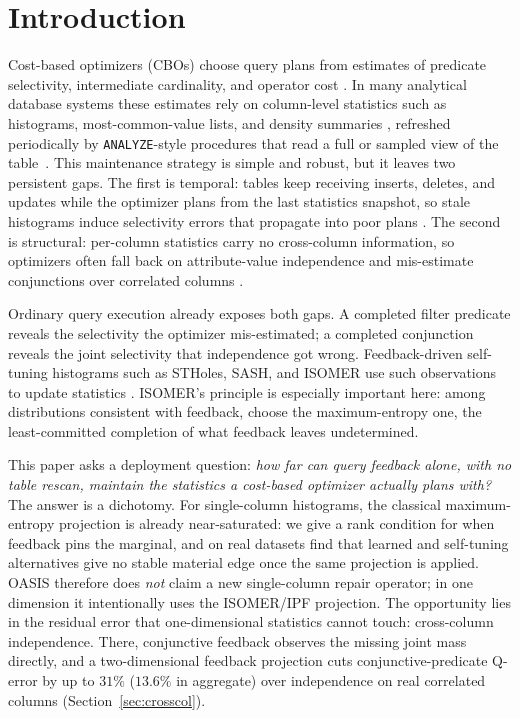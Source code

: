 \documentclass[preprint,12pt]{elsarticle}
\begin{document}
\section{Introduction}
\label{sec:intro}

Cost-based optimizers (CBOs) choose query plans from estimates of predicate
selectivity, intermediate cardinality, and operator cost
\cite{selinger1979access,chaudhuri1998overview}. In many analytical database
systems these estimates rely on column-level statistics such as histograms,
most-common-value lists, and density summaries
\cite{ioannidis1993histogram,poosala1997selectivity,postgresqlPlannerStats,postgresqlRowEstimation},
refreshed periodically by \texttt{ANALYZE}-style procedures that read a full or
sampled view of the table~\cite{postgresqlAnalyze}. This maintenance strategy is
simple and robust, but it leaves two persistent gaps. The first is temporal: tables keep
receiving inserts, deletes, and updates while the optimizer plans from the last statistics
snapshot, so stale histograms induce selectivity errors that propagate into poor plans
\cite{leis2015good,moerkotte2009preventing,han2021cardinality,lee2023impact}. The second is
structural: per-column statistics carry no cross-column information, so optimizers often fall
back on attribute-value independence and mis-estimate conjunctions over correlated columns
\cite{poosala1997selectivity,leis2015good}.

Ordinary query execution already exposes both gaps. A completed filter predicate reveals the
selectivity the optimizer mis-estimated; a completed conjunction reveals the joint selectivity
that independence got wrong. Feedback-driven self-tuning histograms such as STHoles, SASH,
and ISOMER use such observations to update statistics
\cite{aboulnaga1999self,bruno2001stholes,lim2003sash,markl2007consistent}. ISOMER's principle
is especially important here: among distributions consistent with feedback, choose the
maximum-entropy one, the least-committed completion of what feedback leaves undetermined.

This paper asks a deployment question: \emph{how far can query feedback alone, with no table
rescan, maintain the statistics a cost-based optimizer actually plans with?} The answer is a
dichotomy. For single-column histograms, the classical maximum-entropy projection is already
near-saturated: we give a rank condition for when feedback pins the marginal, and on real
datasets find that learned and self-tuning alternatives give no stable material edge once the
same projection is applied. OASIS therefore does \emph{not} claim a new single-column repair
operator; in one dimension it intentionally uses the ISOMER/IPF projection. The opportunity
lies in the residual error that one-dimensional statistics cannot touch: cross-column
independence. There, conjunctive feedback observes the missing joint mass directly, and a
two-dimensional feedback projection cuts conjunctive-predicate Q-error by up to $31\%$
($13.6\%$ in aggregate) over independence on real correlated columns
(Section~\ref{sec:crosscol}).
\end{document}

